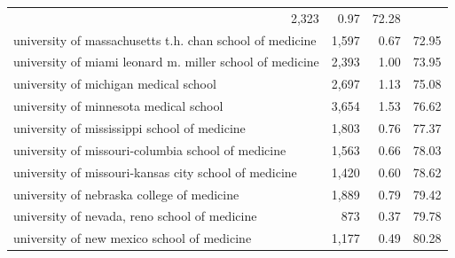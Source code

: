 \begin{table}[!h]
\begin{tabular}{llll}
  \multicolumn{1}{r}{2,323} &
  \multicolumn{1}{r}{0.97} &
  \multicolumn{1}{r}{72.28} \\
\multicolumn{1}{l}{\hspace{1em}university of massachusetts t.h. chan school of medicine} &
  \multicolumn{1}{r}{1,597} &
  \multicolumn{1}{r}{0.67} &
  \multicolumn{1}{r}{72.95} \\
\multicolumn{1}{l}{\hspace{1em}university of miami leonard m. miller school of medicine} &
  \multicolumn{1}{r}{2,393} &
  \multicolumn{1}{r}{1.00} &
  \multicolumn{1}{r}{73.95} \\
\multicolumn{1}{l}{\hspace{1em}university of michigan medical school} &
  \multicolumn{1}{r}{2,697} &
  \multicolumn{1}{r}{1.13} &
  \multicolumn{1}{r}{75.08} \\
\multicolumn{1}{l}{\hspace{1em}university of minnesota medical school} &
  \multicolumn{1}{r}{3,654} &
  \multicolumn{1}{r}{1.53} &
  \multicolumn{1}{r}{76.62} \\
\multicolumn{1}{l}{\hspace{1em}university of mississippi school of medicine} &
  \multicolumn{1}{r}{1,803} &
  \multicolumn{1}{r}{0.76} &
  \multicolumn{1}{r}{77.37} \\
\multicolumn{1}{l}{\hspace{1em}university of missouri-columbia school of medicine} &
  \multicolumn{1}{r}{1,563} &
  \multicolumn{1}{r}{0.66} &
  \multicolumn{1}{r}{78.03} \\
\multicolumn{1}{l}{\hspace{1em}university of missouri-kansas city school of medicine} &
  \multicolumn{1}{r}{1,420} &
  \multicolumn{1}{r}{0.60} &
  \multicolumn{1}{r}{78.62} \\
\multicolumn{1}{l}{\hspace{1em}university of nebraska college of medicine} &
  \multicolumn{1}{r}{1,889} &
  \multicolumn{1}{r}{0.79} &
  \multicolumn{1}{r}{79.42} \\
\multicolumn{1}{l}{\hspace{1em}university of nevada, reno school of medicine} &
  \multicolumn{1}{r}{873} &
  \multicolumn{1}{r}{0.37} &
  \multicolumn{1}{r}{79.78} \\
\multicolumn{1}{l}{\hspace{1em}university of new mexico school of medicine} &
  \multicolumn{1}{r}{1,177} &
  \multicolumn{1}{r}{0.49} &
  \multicolumn{1}{r}{80.28} \\

\end{tabular}
\end{table}
